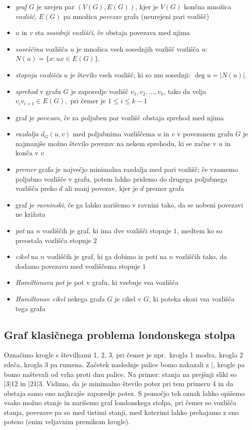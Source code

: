 \documentclass[11pt,a4paper]{article}
\theoremstyle{definition} %
\theoremstyle{plain} %
\newcommand{\vozlisca}[1][G]{\ensuremath{V(#1)}}
\newcommand{\povezave}[1][G]{\ensuremath{E(#1)}}
\DeclareMathOperator {\stopnja} {deg}
\begin{document}
\begin{itemize}
	\item \emph{graf} $G$ je urejen par $(\vozlisca, \povezave)$, kjer je $\vozlisca$ končna množica \emph{vozlišč}, $\povezave$ pa množica \emph{povezav} grafa (neurejeni pari vozlišč)
    \item $u$ in $v$ sta \emph{sosednji vozlišči}, če obstaja povezava med njima
	\item \emph{soseščina} vozlišča $u$ je množica vseh sosednjih vozlišč vozlišča $u$:
	\( N(u) = \{ x\colon ux \in \povezave \} .\)
	\item \emph{stopnja vozlišča} $u$ je število vseh vozlišč, ki so mu sosednji: $\stopnja u = |N(u)|$.
    \item \emph{sprehod} v grafu $G$ je zaporedje vozlišč $v_1, v_2, \ldots, v_k$, tako da velja $v_i v_{i+1} \in E(G),$ pri čemer je $1 \leq i \leq k-1$
    \item graf je \emph{povezan}, če za poljuben par vozlišč obstaja sprehod med njima
    \item \emph{razdalja} $d_G(u,v)$ med poljubnima vozliščema $u$ in $v$ v povezanem grafu $G$ je najmanjše možno število povezav na nekem sprehodu, ki se začne v $u$ in konča v $v$
    \item \emph{premer} grafa je največjo minimalna razdalja med pari vozlišč; če vzamemo poljubno vozlišče v grafu, potem lahko pridemo do drugega poljubnega vozlišča preko $d$ ali manj povezav, kjer je $d$ premer grafa
    \item graf je \emph{ravninski}, če ga lahko narišemo v ravnini tako, da se nobeni povezavi ne križata
    \item \emph{pot} na $n$ vozliščih je graf, ki ima dve vozlišči stopnje $1$, medtem ko so preostala vozlišča stopnje $2$
    \item \emph{cikel} na $n$ vozliščih je graf, ki ga dobimo iz poti na $n$ vozliščih tako, da dodamo povezavo med vozliščema stopnje $1$
    \item \emph{Hamiltonova pot} je pot v grafu, ki vsebuje vsa vozlišča
    \item \emph{Hamiltonov cikel} nekega grafa $G$ je cikel v $G$, ki poteka skozi vsa vozlišča tega grafa

\end{itemize}

\subsection{Graf klasičnega problema londonskega stolpa}
Označimo krogle s številkami 1, 2, 3, pri čemer je npr.\ krogla 1 modra, krogla 2 rdeča, krogla 3 pa rumena. Začetek naslednje palice bomo nakazali z |, krogle pa bomo naštevali od vrha proti dnu palice.
Na primer: stanja na prejšnji sliki so |3|12 in |21|3.
Vidimo, da je minimalno število potez pri tem primeru 4 in da obstaja samo eno najkrajše zaporedje potez.
S pomočjo teh oznak lahko opišemo vsako možno stanje in narišemo graf londonskega stolpa, pri čemer so vozlišča stanja, povezave pa so med tistimi stanji, med katerimi lahko prehajamo z eno potezo (enim veljavnim premikom krogle).
\end{document}
